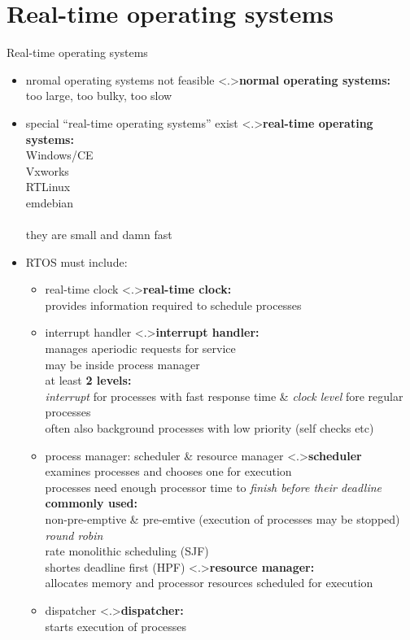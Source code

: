 \documentclass[ngerman={babel}, utf8, bigger, xcolor={table,dvipsnames}, ompress, hyperref={bookmarks,colorlinks}]{beamer}
\begin{document}
\section{Real-time operating systems}
\begin{frame}{Real-time operating systems}
	\begin{itemize}
		\item nromal operating systems not feasible
		\note<.>{\textbf{normal operating systems:}\\ too large, too bulky, too slow}
		\item special ``real-time operating systems'' exist
		\note<.>{\textbf{real-time operating systems:}\\Windows/CE \\ Vxworks \\ RTLinux \\ emdebian\\ \ \\ they are small and damn fast}
		\item RTOS must include:
		\begin{itemize}
			\item real-time clock
			\note<.>{\textbf{real-time clock:}\\ provides information required to schedule processes}
			\item interrupt handler
			\note<.>{\textbf{interrupt handler:}\\ manages aperiodic requests for service \\ may be inside process manager \\ at least \textbf{2 levels:} \\ \emph{interrupt} for processes with fast response time \& \emph {clock level} fore regular processes \\ often also background processes with low priority {\tiny (self checks etc)}}
			\item process manager: scheduler \& resource manager
			\note<.>{\textbf{scheduler}\\ examines processes and chooses one for execution \\ processes need enough processor time to \emph{finish before their deadline} \\ \textbf{commonly used:} \\ non-pre-emptive \& pre-emtive (execution of processes may be stopped) \\ \emph{round robin} \\ rate monolithic scheduling (SJF) \\ shortes deadline first (HPF) }
			\note<.>{\textbf{resource manager:}\\ allocates memory and processor resources scheduled for execution}
			\item dispatcher
			\note<.>{\textbf{dispatcher:}\\ starts execution of processes}
		\end{itemize}
	\end{itemize}
\end{frame}
\end{document}
